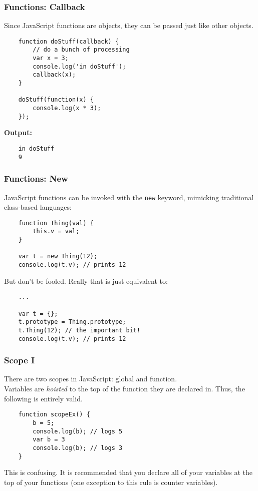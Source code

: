 \documentclass{lug}
\begin{document}
\begin{frame}[fragile]
    \frametitle{Functions: Callback}
    Since JavaScript functions are objects, they can be passed just like other objects.

    \begin{verbatim}
    function doStuff(callback) {
        // do a bunch of processing
        var x = 3;
        console.log('in doStuff');
        callback(x);
    }

    doStuff(function(x) {
        console.log(x * 3);
    });
    \end{verbatim}

    \textbf{Output:}
    \begin{verbatim}
    in doStuff
    9
    \end{verbatim}
\end{frame}

\begin{frame}[fragile]
    \frametitle{Functions: New}
    JavaScript functions can be invoked with the \texttt{new} keyword, mimicking traditional class-based languages:

    \begin{verbatim}
    function Thing(val) {
        this.v = val;
    }

    var t = new Thing(12);
    console.log(t.v); // prints 12
    \end{verbatim}

    But don't be fooled. Really that is just equivalent to:

    \begin{verbatim}
    ...

    var t = {};
    t.prototype = Thing.prototype;
    t.Thing(12); // the important bit!
    console.log(t.v); // prints 12
    \end{verbatim}
\end{frame}

\begin{frame}[fragile]
    \frametitle{Scope I}

    There are two scopes in JavaScript: global and function.\footnotemark[1]\\

    Variables are \textit{hoisted} to the top of the function they are declared in. Thus, the
    following is entirely valid.

    \begin{verbatim}
    function scopeEx() {
        b = 5;
        console.log(b); // logs 5
        var b = 3
        console.log(b); // logs 3
    }
    \end{verbatim}

    This is confusing. It is recommended that you declare all of your variables at the top of your
    functions (one exception to this rule is counter variables).

\end{frame}
\end{document}
